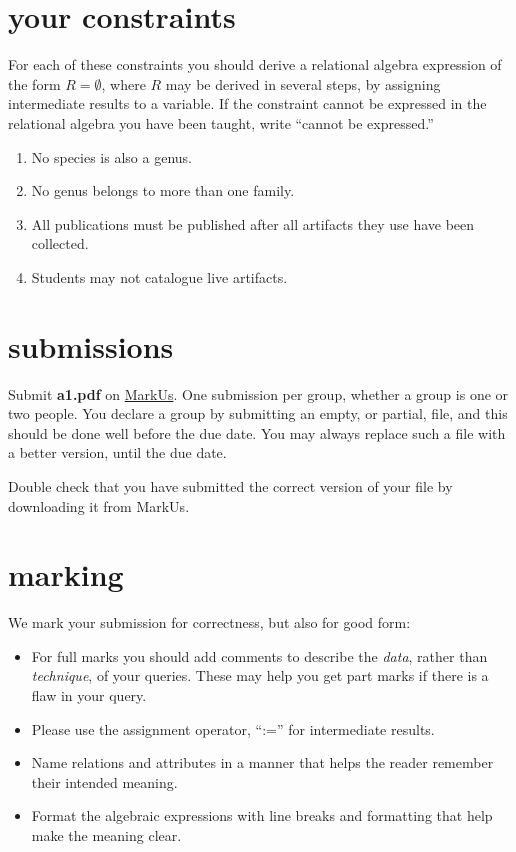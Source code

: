 \documentclass[boldsans]{article}
\begin{document}
\section*{your constraints}

For each of these constraints you should derive a relational algebra
expression of the form $R = \emptyset$, where $R$ may be derived in
several steps, by assigning intermediate results to a variable.  If
the constraint cannot be expressed in the relational algebra you have
been taught, write ``cannot be expressed.''

\begin{enumerate}
\item No species is also a genus.
\item No genus belongs to more than one family.
\item All publications must be published after all artifacts they use
  have been collected.
\item Students may not catalogue live artifacts.
\end{enumerate}
\section*{submissions}

Submit \textbf{a1.pdf} on \href{https://markus.teach.cs.toronto.edu/csc343-2020-01}{MarkUs}.
One submission per group, whether a group is one or two people.  You
declare a group by submitting an empty, or partial, file, and this
should be done well before the due date.  You may always replace such
a file with a better version, until the due date.

Double check that you have submitted the correct version of your file
by downloading it from MarkUs.

\section*{marking}

We mark your submission for correctness, but also for good form:
\begin{itemize}
\item For full marks you should add comments to describe the \textit{data}, rather than
  \textit{technique}, of  your queries.  These may help you get part
  marks if there is a flaw in your query.
\item Please use the assignment operator, ``:='' for intermediate results.
\item Name relations and attributes in a manner that helps the reader
  remember their intended meaning.
\item Format the algebraic expressions with line breaks and formatting
  that help make the meaning clear.
\end{itemize}
\end{document}
